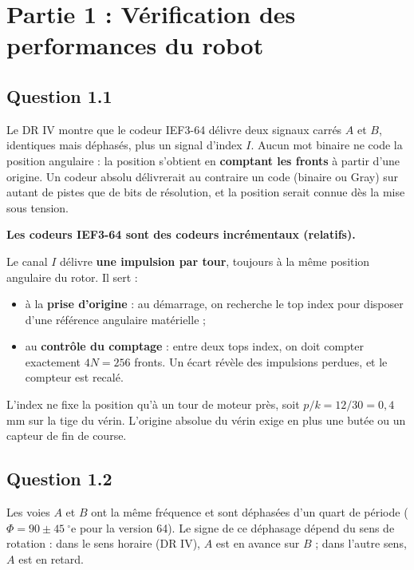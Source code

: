 \documentclass[11pt,a4paper]{article}
\providecommand{\tightlist}{\setlength{\itemsep}{0pt}\setlength{\parskip}{0pt}}
\begin{document}
\hypertarget{partie-1-vuxe9rification-des-performances-du-robot}{%
\section{Partie 1 : Vérification des performances du robot}\label{partie-1-vuxe9rification-des-performances-du-robot}}

\hypertarget{question-1.1}{%
\subsection{Question 1.1}\label{question-1.1}}

Le DR IV montre que le codeur IEF3-64 délivre deux signaux carrés \(A\) et \(B\), identiques mais déphasés, plus un signal d'index \(I\). Aucun mot binaire ne code la position angulaire : la position s'obtient en \textbf{comptant les fronts} à partir d'une origine. Un codeur absolu délivrerait au contraire un code (binaire ou Gray) sur autant de pistes que de bits de résolution, et la position serait connue dès la mise sous tension.

\textbf{Les codeurs IEF3-64 sont des codeurs incrémentaux (relatifs).}

Le canal \(I\) délivre \textbf{une impulsion par tour}, toujours à la même position angulaire du rotor. Il sert :

\begin{itemize}
\tightlist
\item
  à la \textbf{prise d'origine} : au démarrage, on recherche le top index pour disposer d'une référence angulaire matérielle ;
\item
  au \textbf{contrôle du comptage} : entre deux tops index, on doit compter exactement \(4N = 256\) fronts. Un écart révèle des impulsions perdues, et le compteur est recalé.
\end{itemize}

L'index ne fixe la position qu'à un tour de moteur près, soit \(p/k = 12/30 = 0{,}4\) mm sur la tige du vérin. L'origine absolue du vérin exige en plus une butée ou un capteur de fin de course.

\hypertarget{question-1.2}{%
\subsection{Question 1.2}\label{question-1.2}}

Les voies \(A\) et \(B\) ont la même fréquence et sont déphasées d'un quart de période (\(\Phi = 90 \pm 45\ ^\circ\text{e}\) pour la version 64). Le signe de ce déphasage dépend du sens de rotation : dans le sens horaire (DR IV), \(A\) est en avance sur \(B\) ; dans l'autre sens, \(A\) est en retard.
\end{document}
